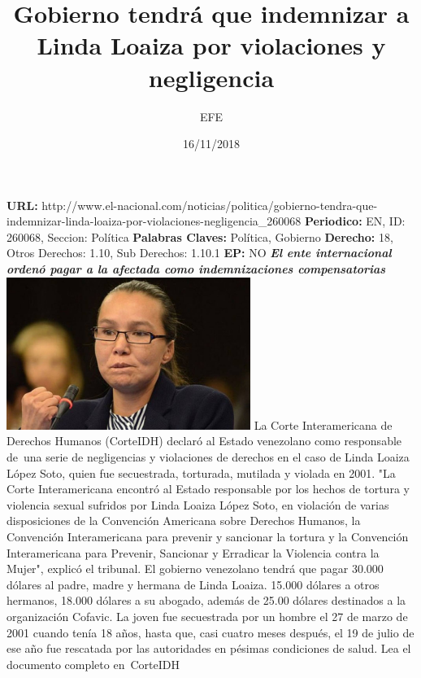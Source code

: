 \documentclass{article}%
\title{\textbf{Gobierno tendrá que indemnizar a Linda Loaiza por violaciones y negligencia}}%
\author{EFE}%
\date{16/11/2018}%
\begin{document}
%
\normalsize%
\maketitle%
\textbf{URL: }%
http://www.el{-}nacional.com/noticias/politica/gobierno{-}tendra{-}que{-}indemnizar{-}linda{-}loaiza{-}por{-}violaciones{-}negligencia\_260068\newline%
%
\textbf{Periodico: }%
EN, %
ID: %
260068, %
Seccion: %
Política\newline%
%
\textbf{Palabras Claves: }%
Política, Gobierno\newline%
%
\textbf{Derecho: }%
18, %
Otros Derechos: %
1.10, %
Sub Derechos: %
1.10.1\newline%
%
\textbf{EP: }%
NO\newline%
\newline%
%
\textbf{\textit{El ente internacional ordenó pagar a la afectada como indemnizaciones compensatorias}}%
\newline%
\newline%
%
\includegraphics[width=300px]{265.jpg}%
\newline%
%
La Corte Interamericana de Derechos Humanos (CorteIDH) declaró al Estado venezolano como responsable de~una serie de negligencias y violaciones de derechos en el caso de Linda Loaiza López Soto, quien fue secuestrada, torturada, mutilada y violada en 2001.%
\newline%
%
"La Corte Interamericana encontró al Estado responsable por los hechos de tortura y violencia sexual sufridos por Linda Loaiza López Soto, en violación de varias disposiciones de la Convención Americana sobre Derechos Humanos, la Convención Interamericana para prevenir y sancionar la tortura y la Convención Interamericana para Prevenir, Sancionar y Erradicar la Violencia contra la Mujer", explicó el tribunal.%
\newline%
%
El gobierno venezolano tendrá que pagar 30.000 dólares al padre, madre y hermana de Linda Loaiza. 15.000 dólares a otros hermanos, 18.000 dólares a su abogado, además de 25.00 dólares destinados a la organización Cofavic.%
\newline%
%
La joven fue secuestrada por un hombre el 27 de marzo de 2001 cuando tenía 18 años, hasta que, casi cuatro meses después, el 19 de julio de ese año fue rescatada por las autoridades en pésimas condiciones de salud.%
\newline%
%
Lea el documento completo en~CorteIDH%
\newline%
%
\end{document}
